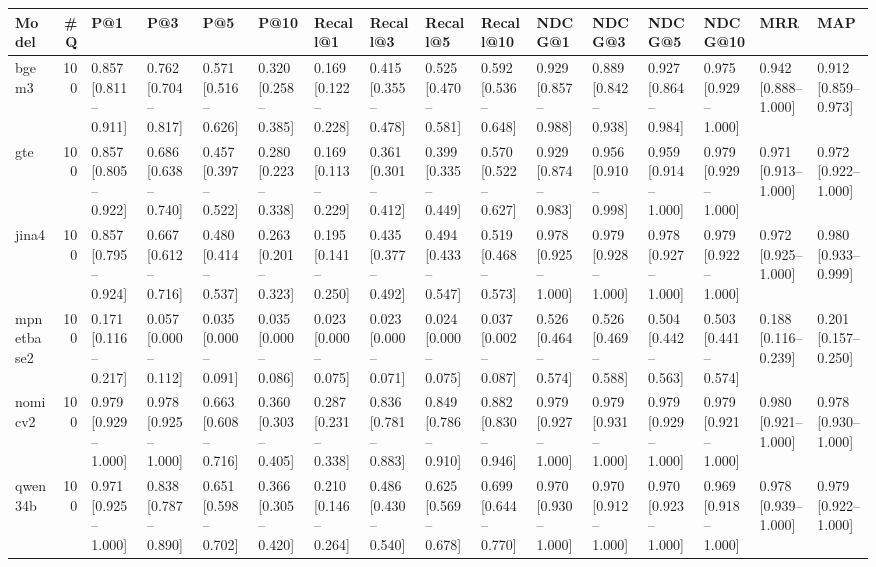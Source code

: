 \begin{tabular}{lrllllllllllllll}
\toprule
     Model &  #Q &                 P@1 &                 P@3 &                 P@5 &                P@10 &            Recall@1 &            Recall@3 &            Recall@5 &           Recall@10 &              NDCG@1 &              NDCG@3 &              NDCG@5 &             NDCG@10 &                 MRR &                 MAP \\
\midrule
     bgem3 & 100 & 0.857 [0.811–0.911] & 0.762 [0.704–0.817] & 0.571 [0.516–0.626] & 0.320 [0.258–0.385] & 0.169 [0.122–0.228] & 0.415 [0.355–0.478] & 0.525 [0.470–0.581] & 0.592 [0.536–0.648] & 0.929 [0.857–0.988] & 0.889 [0.842–0.938] & 0.927 [0.864–0.984] & 0.975 [0.929–1.000] & 0.942 [0.888–1.000] & 0.912 [0.859–0.973] \\
       gte & 100 & 0.857 [0.805–0.922] & 0.686 [0.638–0.740] & 0.457 [0.397–0.522] & 0.280 [0.223–0.338] & 0.169 [0.113–0.229] & 0.361 [0.301–0.412] & 0.399 [0.335–0.449] & 0.570 [0.522–0.627] & 0.929 [0.874–0.983] & 0.956 [0.910–0.998] & 0.959 [0.914–1.000] & 0.979 [0.929–1.000] & 0.971 [0.913–1.000] & 0.972 [0.922–1.000] \\
     jina4 & 100 & 0.857 [0.795–0.924] & 0.667 [0.612–0.716] & 0.480 [0.414–0.537] & 0.263 [0.201–0.323] & 0.195 [0.141–0.250] & 0.435 [0.377–0.492] & 0.494 [0.433–0.547] & 0.519 [0.468–0.573] & 0.978 [0.925–1.000] & 0.979 [0.928–1.000] & 0.978 [0.927–1.000] & 0.979 [0.922–1.000] & 0.972 [0.925–1.000] & 0.980 [0.933–0.999] \\
mpnetbase2 & 100 & 0.171 [0.116–0.217] & 0.057 [0.000–0.112] & 0.035 [0.000–0.091] & 0.035 [0.000–0.086] & 0.023 [0.000–0.075] & 0.023 [0.000–0.071] & 0.024 [0.000–0.075] & 0.037 [0.002–0.087] & 0.526 [0.464–0.574] & 0.526 [0.469–0.588] & 0.504 [0.442–0.563] & 0.503 [0.441–0.574] & 0.188 [0.116–0.239] & 0.201 [0.157–0.250] \\
   nomicv2 & 100 & 0.979 [0.929–1.000] & 0.978 [0.925–1.000] & 0.663 [0.608–0.716] & 0.360 [0.303–0.405] & 0.287 [0.231–0.338] & 0.836 [0.781–0.883] & 0.849 [0.786–0.910] & 0.882 [0.830–0.946] & 0.979 [0.927–1.000] & 0.979 [0.931–1.000] & 0.979 [0.929–1.000] & 0.979 [0.921–1.000] & 0.980 [0.921–1.000] & 0.978 [0.930–1.000] \\
   qwen34b & 100 & 0.971 [0.925–1.000] & 0.838 [0.787–0.890] & 0.651 [0.598–0.702] & 0.366 [0.305–0.420] & 0.210 [0.146–0.264] & 0.486 [0.430–0.540] & 0.625 [0.569–0.678] & 0.699 [0.644–0.770] & 0.970 [0.930–1.000] & 0.970 [0.912–1.000] & 0.970 [0.923–1.000] & 0.969 [0.918–1.000] & 0.978 [0.939–1.000] & 0.979 [0.922–1.000] \\
\bottomrule
\end{tabular}
